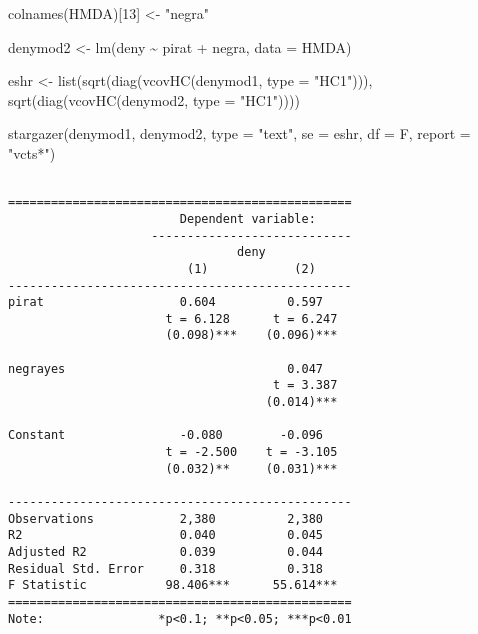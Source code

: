 \documentclass[
  letterpaper,
  DIV=11,
  numbers=noendperiod]{scrreprt}
\newenvironment{Shaded}{\begin{snugshade}}{\end{snugshade}}
\newcommand{\AttributeTok}[1]{\textcolor[rgb]{0.40,0.45,0.13}{#1}}
\newcommand{\DecValTok}[1]{\textcolor[rgb]{0.68,0.00,0.00}{#1}}
\newcommand{\FunctionTok}[1]{\textcolor[rgb]{0.28,0.35,0.67}{#1}}
\newcommand{\NormalTok}[1]{\textcolor[rgb]{0.00,0.23,0.31}{#1}}
\newcommand{\OtherTok}[1]{\textcolor[rgb]{0.00,0.23,0.31}{#1}}
\newcommand{\SpecialCharTok}[1]{\textcolor[rgb]{0.37,0.37,0.37}{#1}}
\newcommand{\StringTok}[1]{\textcolor[rgb]{0.13,0.47,0.30}{#1}}
\begin{document}
\begin{Shaded}
\begin{Highlighting}[]
\FunctionTok{colnames}\NormalTok{(HMDA)[}\DecValTok{13}\NormalTok{] }\OtherTok{\textless{}{-}} \StringTok{"negra"}

\NormalTok{denymod2 }\OtherTok{\textless{}{-}} \FunctionTok{lm}\NormalTok{(deny }\SpecialCharTok{\textasciitilde{}} 
\NormalTok{                 pirat }\SpecialCharTok{+} 
\NormalTok{                 negra, }
               \AttributeTok{data =}\NormalTok{ HMDA)}

\NormalTok{eshr }\OtherTok{\textless{}{-}} \FunctionTok{list}\NormalTok{(}\FunctionTok{sqrt}\NormalTok{(}\FunctionTok{diag}\NormalTok{(}\FunctionTok{vcovHC}\NormalTok{(denymod1, }
                              \AttributeTok{type =} \StringTok{"HC1"}\NormalTok{))),}
             \FunctionTok{sqrt}\NormalTok{(}\FunctionTok{diag}\NormalTok{(}\FunctionTok{vcovHC}\NormalTok{(denymod2, }
                              \AttributeTok{type =} \StringTok{"HC1"}\NormalTok{))))}


\FunctionTok{stargazer}\NormalTok{(denymod1, }
\NormalTok{          denymod2,}
          \AttributeTok{type =} \StringTok{"text"}\NormalTok{,}
          \AttributeTok{se =}\NormalTok{ eshr,}
          \AttributeTok{df =}\NormalTok{ F, }
          \AttributeTok{report =} \StringTok{"vcts*"}\NormalTok{)}
\end{Highlighting}
\end{Shaded}

\begin{verbatim}

================================================
                        Dependent variable:     
                    ----------------------------
                                deny            
                         (1)            (2)     
------------------------------------------------
pirat                   0.604          0.597    
                      t = 6.128      t = 6.247  
                      (0.098)***    (0.096)***  
                                                
negrayes                               0.047    
                                     t = 3.387  
                                    (0.014)***  
                                                
Constant                -0.080        -0.096    
                      t = -2.500    t = -3.105  
                      (0.032)**     (0.031)***  
                                                
------------------------------------------------
Observations            2,380          2,380    
R2                      0.040          0.045    
Adjusted R2             0.039          0.044    
Residual Std. Error     0.318          0.318    
F Statistic           98.406***      55.614***  
================================================
Note:                *p<0.1; **p<0.05; ***p<0.01
\end{verbatim}
\end{document}
